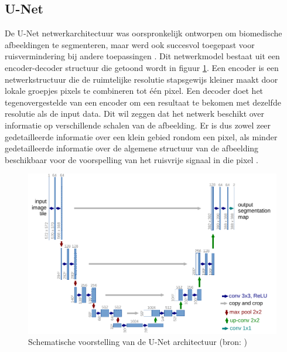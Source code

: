 \documentclass{report}
\begin{document}
\subsection{U-Net}
De U-Net netwerkarchitectuur was oorspronkelijk ontworpen om biomedische afbeeldingen te segmenteren, maar werd ook succesvol toegepast voor ruisvermindering bij andere toepassingen \cite{paper:n2n, paper:n2v, paper:unet}. Dit netwerkmodel bestaat uit een encoder-decoder structuur die getoond wordt in figuur \ref{fig:tem_unet}. Een encoder is een netwerkstructuur die de ruimtelijke resolutie stapsgewijs kleiner maakt door lokale groepjes pixels te combineren tot één pixel. Een decoder doet het tegenovergestelde van een encoder om een resultaat te bekomen met dezelfde resolutie als de input data. Dit wil zeggen dat het netwerk beschikt over informatie op verschillende schalen van de afbeelding. Er is dus zowel zeer gedetailleerde informatie over een klein gebied rondom een pixel, als minder gedetailleerde informatie over de algemene structuur van de afbeelding beschikbaar voor de voorspelling van het ruisvrije signaal in die pixel \cite{paper:unet}.
\begin{figure}[h!]
	\centering
	\includegraphics[width=12cm]{images/tem/unet.pdf}
	\caption{Schematische voorstelling van de U-Net architectuur (bron: \cite{paper:unet})}
	\label{fig:tem_unet}
\end{figure}
\\ \\
\end{document}
